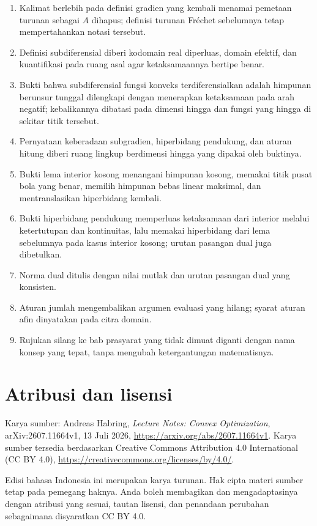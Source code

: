 \documentclass[indonesian]{shinybook}
\begin{document}
\begin{enumerate}
    \item Kalimat berlebih pada definisi gradien yang kembali menamai pemetaan turunan sebagai \(A\) dihapus; definisi turunan Fréchet sebelumnya tetap mempertahankan notasi tersebut.
    \item Definisi subdiferensial diberi kodomain real diperluas, domain efektif, dan kuantifikasi pada ruang asal agar ketaksamaannya bertipe benar.
    \item Bukti bahwa subdiferensial fungsi konveks terdiferensialkan adalah himpunan berunsur tunggal dilengkapi dengan menerapkan ketaksamaan pada arah negatif; kebalikannya dibatasi pada dimensi hingga dan fungsi yang hingga di sekitar titik tersebut.
    \item Pernyataan keberadaan subgradien, hiperbidang pendukung, dan aturan hitung diberi ruang lingkup berdimensi hingga yang dipakai oleh buktinya.
    \item Bukti lema interior kosong menangani himpunan kosong, memakai titik pusat bola yang benar, memilih himpunan bebas linear maksimal, dan mentranslasikan hiperbidang kembali.
    \item Bukti hiperbidang pendukung memperluas ketaksamaan dari interior melalui ketertutupan dan kontinuitas, lalu memakai hiperbidang dari lema sebelumnya pada kasus interior kosong; urutan pasangan dual juga dibetulkan.
    \item Norma dual ditulis dengan nilai mutlak dan urutan pasangan dual yang konsisten.
    \item Aturan jumlah mengembalikan argumen evaluasi yang hilang; syarat aturan afin dinyatakan pada citra domain.
    \item Rujukan silang ke bab prasyarat yang tidak dimuat diganti dengan nama konsep yang tepat, tanpa mengubah ketergantungan matematisnya.
\end{enumerate}

\chapter*{Atribusi dan lisensi}
Karya sumber: Andreas Habring, \emph{Lecture Notes: Convex Optimization}, arXiv:2607.11664v1, 13 Juli 2026, \url{https://arxiv.org/abs/2607.11664v1}. Karya sumber tersedia berdasarkan Creative Commons Attribution 4.0 International (CC BY 4.0), \url{https://creativecommons.org/licenses/by/4.0/}.

Edisi bahasa Indonesia ini merupakan karya turunan. Hak cipta materi sumber tetap pada pemegang haknya. Anda boleh membagikan dan mengadaptasinya dengan atribusi yang sesuai, tautan lisensi, dan penandaan perubahan sebagaimana disyaratkan CC BY 4.0.
\end{document}
